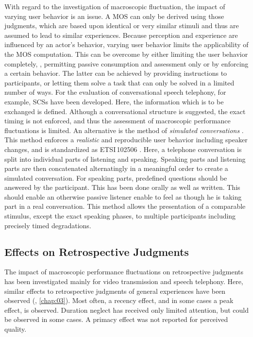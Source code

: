 With regard to the investigation of macroscopic fluctuation, the impact of varying user behavior is an issue.
A \ac{MOS} can only be derived using those judgments, which are based upon identical or very similar stimuli and thus are assumed to lead to similar experiences.
Because perception and experience are influenced by an actor's behavior, varying user behavior limits the applicability of the \ac{MOS} computation.
This can be overcome by either limiting the user behavior completely, \ie, permitting passive consumption and assessment only or by enforcing a certain behavior.
The latter can be achieved by providing instructions to participants, or letting them solve a task that can only be solved in a limited number of ways.
For the evaluation of conversational speech telephony, for example, \acp{SCS} have been developed.
Here, the information which is to be exchanged is defined.
Although a conversational structure is suggested, the exact timing is not enforced, and thus the assessment of macroscopic performance fluctuations is limited.
An alternative is the method of \emph{simulated conversations} \citep{weiss_modeling_2009, berger_estimation_2008}.
This method enforces a \emph{realistic} and reproducible user behavior including speaker changes, and is standardized as ETSI\,102506 \citep{etsi_speech_2011}.
Here, a telephone conversation is split into individual parts of listening and speaking.
Speaking parts and listening parts are then concatenated alternatingly in a meaningful order to create a simulated conversation.
For speaking parts, predefined questions should be answered by the participant.
This has been done orally as well as written.
This should enable an otherwise passive listener enable to feel as though he is taking part in a real conversation.
This method allows the presentation of a comparable stimulus, except the exact speaking phases, to multiple participants including precisely timed degradations.

\subsection{Effects on Retrospective Judgments}
The impact of macroscopic performance fluctuations on retrospective judgments has been investigated mainly for video transmission and speech telephony.
Here, similar effects to retrospective judgments of general experiences have been observed (\cf, \autoref{chap:03}).
Most often, a recency effect, and in some cases a peak effect, is observed.
Duration neglect has received only limited attention, but could be observed in some cases.
A primacy effect was not reported for perceived quality.

